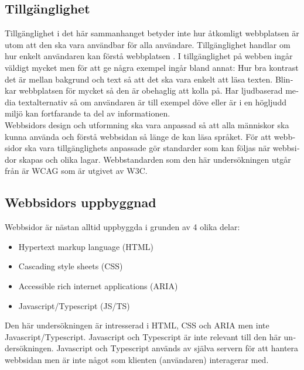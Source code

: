 \documentclass[11p]{article}
\begin{document}
\begin{otherlanguage}{swedish}
    \subsection{Tillgänglighet}
    Tillgänglighet i det här sammanhanget betyder inte hur åtkomligt webbplatsen är utom att den ska vara användbar för alla användare. %
    Tillgänglighet handlar om hur enkelt användaren kan förstå webbplatsen \parencite{webbriktlinjer}.
    I tillgänglighet på webben ingår väldigt mycket men för att ge några exempel ingår bland annat:
    Hur bra kontrast det är mellan bakgrund och text så att det ska vara enkelt att läsa texten.
    Blinkar webbplatsen för mycket så den är obehaglig att kolla på.
    Har ljudbaserad media textalternativ så om användaren är till exempel döve eller är i en högljudd miljö kan fortfarande ta del av informationen.
    \\Webbsidors design och utformning ska vara anpassad så att alla människor ska kunna använda och förstå webbsidan så länge de kan läsa språket.
    För att webbsidor ska vara tillgänglighets anpassade gör standarder som kan följas när webbsidor skapas och olika lagar.
    Webbstandarden som den här undersökningen utgår från är WCAG som är utgivet av W3C. %


    \subsection{Webbsidors uppbyggnad}
    Webbsidor är nästan alltid uppbyggda i grunden av 4 olika delar: %
    \begin{itemize}
        \item Hypertext markup language (HTML)
        \item Cascading style sheets (CSS)
        \item Accessible rich internet applications (ARIA)
        \item Javascript/Typescript (JS/TS)
    \end{itemize}
    Den här undersökningen är intresserad i HTML, CSS och ARIA men inte Javascript/Typescript.
    Javascript och Typescript är inte relevant till den här undersökningen.
    Javascript och Typescript används av själva servern för att hantera webbsidan men är inte något som klienten (användaren) interagerar med. %


\end{otherlanguage}
\end{document}
